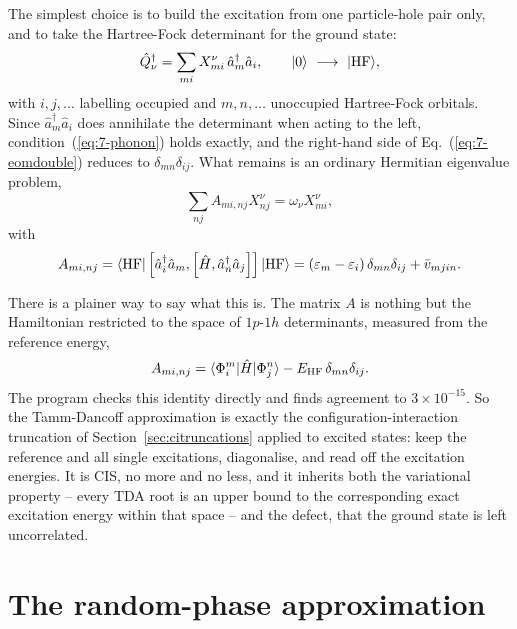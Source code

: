 The simplest choice is to build the excitation from one particle-hole pair
only, and to take the Hartree-Fock determinant for the ground state:
\begin{equation}
  \hat{Q}^{\dagger}_{\nu} = \sum_{mi}X^{\nu}_{mi}\,
    \hat{a}^{\dagger}_{m}\hat{a}_{i},
  \qquad
  \vert 0 \rangle\ \longrightarrow\ \vert \mathrm{HF} \rangle,
  \label{eq:7-tdaoperator}
\end{equation}
with $i,j,\dots$ labelling occupied and $m,n,\dots$ unoccupied Hartree-Fock
orbitals.  Since $\hat{a}^{\dagger}_{m}\hat{a}_{i}$ does annihilate the
determinant when acting to the left, condition~(\ref{eq:7-phonon}) holds
exactly, and the right-hand side of Eq.~(\ref{eq:7-eomdouble}) reduces to
$\delta_{mn}\delta_{ij}$.  What remains is an ordinary Hermitian eigenvalue
problem,
\begin{equation}
  \sum_{nj}A_{mi,nj}X^{\nu}_{nj} = \omega_{\nu}X^{\nu}_{mi},
  \label{eq:7-tdaequation}
\end{equation}
with
\begin{equation}
  A_{mi,nj}
   = \langle \mathrm{HF} | \left[\hat{a}^{\dagger}_{i}\hat{a}_{m},
       \left[\hat{H},\hat{a}^{\dagger}_{n}\hat{a}_{j}\right]\right] | \mathrm{HF} \rangle
   = \left(\varepsilon_m-\varepsilon_i\right)
     \delta_{mn}\delta_{ij} + \bar{v}_{mjin}.
  \label{eq:7-Amatrix}
\end{equation}

There is a plainer way to say what this is.  The matrix $A$ is nothing but the
Hamiltonian restricted to the space of $1p$-$1h$ determinants, measured from
the reference energy,
\begin{equation}
  A_{mi,nj}
   = \langle \Phi^m_i | \hat{H} | \Phi^n_j \rangle
     - E_{\mathrm{HF}}\,\delta_{mn}\delta_{ij}.
  \label{eq:7-Aisci}
\end{equation}
The program checks this identity directly and finds agreement to
$3\times10^{-15}$.  So the Tamm-Dancoff approximation is exactly the
configuration-interaction truncation of Section~\ref{sec:citruncations}
applied to excited states: keep the reference and all single excitations,
diagonalise, and read off the excitation energies.  It is CIS, no more and no
less, and it inherits both the variational property -- every TDA root is an
upper bound to the corresponding exact excitation energy within that space --
and the defect, that the ground state is left uncorrelated.

\section{The random-phase approximation}
\label{sec:rpa}

